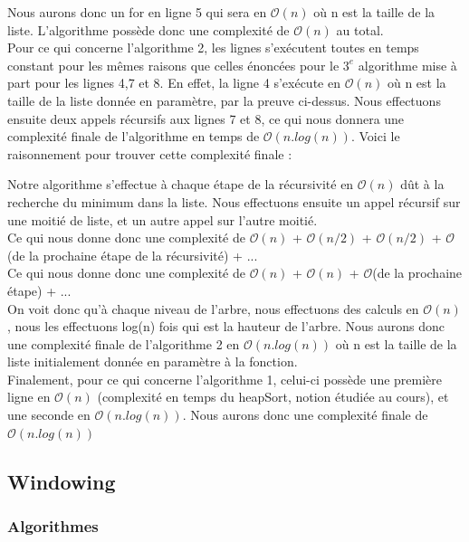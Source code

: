 \documentclass[10pt,a4paper]{article}
\begin{document}
Nous aurons donc un for en ligne 5 qui sera en $\mathcal{O}(n)$ où n est la taille de la liste.
L'algorithme possède donc une complexité de $\mathcal{O}(n)$ au total.
\\
Pour ce qui concerne l'algorithme 2, les lignes s'exécutent toutes en temps constant pour les mêmes raisons que celles énoncées pour le $3^e$ algorithme mise à part pour les lignes 4,7 et 8.
En effet, la ligne 4 s’exécute en $\mathcal{O}(n)$ où n est la taille de la liste donnée en paramètre, par la preuve ci-dessus. Nous effectuons ensuite deux appels récursifs aux lignes 7 et 8, ce qui nous donnera une complexité finale de l'algorithme en temps de $\mathcal{O}(n.log(n))$. Voici le raisonnement pour trouver cette complexité finale :

Notre algorithme s'effectue à chaque étape de la récursivité en $\mathcal{O}(n)$ dût à la recherche du minimum dans la liste. Nous effectuons ensuite un appel récursif sur une moitié de liste, et un autre appel sur l'autre moitié.\\ Ce qui nous donne donc une complexité de $\mathcal{O}(n)$ + $\mathcal{O}(n/2)$ + $\mathcal{O}(n/2)$ + $\mathcal{O}$(de la prochaine étape de la récursivité) + ...\\Ce qui nous donne donc une complexité de $\mathcal{O}(n)$ + $\mathcal{O}(n)$ + $\mathcal{O}$(de la prochaine étape) + ...\\ On voit donc qu'à chaque niveau de l'arbre, nous effectuons des calculs en $\mathcal{O}(n)$, nous les effectuons log(n) fois qui est la hauteur de l'arbre. Nous aurons donc une complexité finale de l’algorithme 2 en $\mathcal{O}(n.log(n))$ où n est la taille de la liste initialement donnée en paramètre à la fonction.
\\

Finalement, pour ce qui concerne l'algorithme 1, celui-ci possède une première ligne en $\mathcal{O}(n)$ (complexité en temps du heapSort, notion étudiée au cours), et une seconde en $\mathcal{O}(n.log(n))$. Nous aurons donc une complexité finale de $\mathcal{O}(n.log(n))$

\subsection{Windowing}


\subsubsection{Algorithmes}
\end{document}
